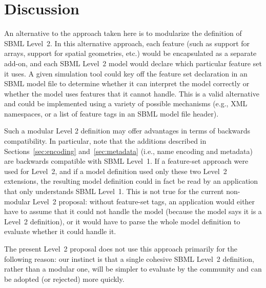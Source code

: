 \documentclass[10pt]{cekarticle}
\begin{document}



\section{Discussion}

An alternative to the approach taken here is to modularize the definition
of SBML Level~2.  In this alternative approach, each feature (such as
support for arrays, support for spatial geometries, etc.)  would be
encapsulated as a separate add-on, and each SBML Level~2 model would
declare which particular feature set it uses.  A given simulation tool
could key off the feature set declaration in an SBML model file to
determine whether it can interpret the model correctly or whether the model
uses features that it cannot handle.  This is a valid alternative and could
be implemented using a variety of possible mechanisms (e.g., XML
namespaces, or a list of feature tags in an SBML model file header).

Such a modular Level 2 definition may offer advantages in terms of
backwards compatibility.  In particular, note that the additions described
in Sections~\ref{sec:encoding} and~\ref{sec:metadata} (i.e., name encoding
and metadata) are backwards compatible with SBML Level~1.  If a feature-set
approach were used for Level~2, and if a model definition used only these
two Level~2 extensions, the resulting model definition could in fact be
read by an application that only understands SBML Level~1.  This is not
true for the current non-modular Level~2 proposal: without feature-set
tags, an application would either have to assume that it could not handle
the model (because the model says it is a Level~2 definition), or it would
have to parse the whole model definition to evaluate whether it could
handle it.

The present Level~2 proposal does not use this approach primarily for the
following reason: our instinct is that a single cohesive SBML Level~2
definition, rather than a modular one, will be simpler to evaluate by the
community and can be adopted (or rejected) more quickly.
\end{document}
